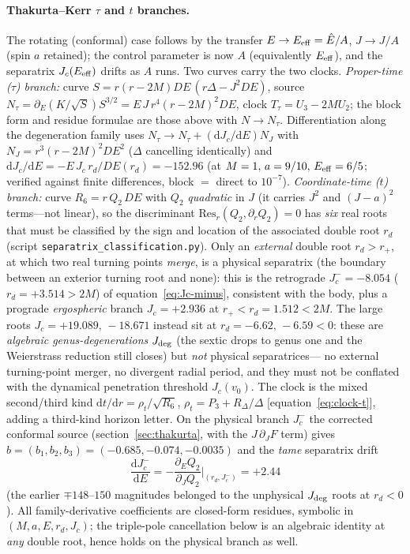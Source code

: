 \documentclass[12pt]{iopart}
\theoremstyle{plain}
\theoremstyle{definition}
\theoremstyle{remark}
\newcommand{\Ehat}{\hat E}
\newcommand{\Jc}{J_{c}}
\newcommand{\dd}{\mathrm{d}}
\begin{document}
\paragraph{Thakurta--Kerr $\tau$ and $t$ branches.}
The rotating (conformal) case follows by the transfer $E\to E_{\rm eff}=\Ehat/A$,
$J\to J/A$ (spin $a$ retained); the control parameter is now $A$ (equivalently $E_{\rm eff}$), and
the separatrix $\Jc(E_{\rm eff})$ drifts as $A$ runs. Two curves carry the two clocks.
\emph{Proper-time ($\tau$) branch:} curve $S=r(r-2M)DE\,(r\Delta-J^2DE)$, source
$N_\tau=\partial_E(K/\sqrt S)S^{3/2}=E\,J\,r^4(r-2M)^2DE$, clock
$T_\tau=U_3-2MU_2$; the block form and residue formulae are those above with
$N\to N_\tau$. Differentiation along the degeneration family uses $N_\tau\to N_\tau+(\dd\Jc/\dd E)N_J$ with
$N_J=r^3(r-2M)^2DE^2$ ($\Delta$ cancelling identically) and
$\dd\Jc/\dd E=-E\,\Jc\,r_d/DE(r_d)=-152.96$ (at $M=1,\,a=9/10,\,E_{\rm eff}=6/5$;
verified against finite differences, block $=$ direct to $10^{-7}$).
\emph{Coordinate-time ($t$) branch:} curve $R_6=r\,Q_2\,DE$ with $Q_2$
\emph{quadratic} in $J$ (it carries $J^2$ and $(J-a)^2$ terms---not linear), so the
discriminant $\mathrm{Res}_r(Q_2,\partial_r Q_2)=0$ has \emph{six} real roots that
must be classified by the sign and location of the associated double root $r_d$
(script \texttt{separatrix\_classification.py}). Only an \emph{external} double
root $r_d>r_+$, at which two real turning points \emph{merge}, is a physical
separatrix (the boundary between an exterior turning root and none): this is the retrograde $\Jc^-=-8.054$
($r_d=+3.514>2M$) of equation~\eqref{eq:Jc-minus}, consistent with the body, plus a
prograde \emph{ergospheric} branch $\Jc=+2.936$ at $r_+<r_d=1.512<2M$. The large
roots $\Jc=+19.089,\,-18.671$ instead sit at $r_d=-6.62,\,-6.59<0$: these are
\emph{algebraic genus-degenerations} $J_{\rm deg}$ (the sextic drops to genus one
and the Weierstrass reduction still closes) but \emph{not} physical separatrices---
no external turning-point merger, no divergent radial period, and they must not be
conflated with the dynamical penetration threshold $J_c(v_0)$. The clock is the
mixed second/third kind $\dd t/\dd r=\rho_t/\sqrt{R_6}$, $\rho_t=P_3+R_\Delta/\Delta$
[equation~\eqref{eq:clock-t}], adding a third-kind horizon letter. On the physical branch
$\Jc^-$ the corrected conformal source (section~\ref{sec:thakurta}, with the
$J\,\partial_J F$ term) gives $b=(b_1,b_2,b_3)=(-0.685,-0.074,-0.0035)$ and the
\emph{tame} separatrix drift
\begin{equation}
\frac{\dd\Jc^-}{\dd E}=-\frac{\partial_E Q_2}{\partial_J Q_2}\bigg|_{(r_d,\Jc^-)}=+2.44
\end{equation}
(the earlier $\mp148$--$150$ magnitudes belonged to the unphysical $J_{\rm deg}$
roots at $r_d<0$). All family-derivative coefficients are closed-form residues, symbolic in
$(M,a,E,r_d,\Jc)$; the triple-pole cancellation below is an algebraic identity at
\emph{any} double root, hence holds on the physical branch as well.
\end{document}
